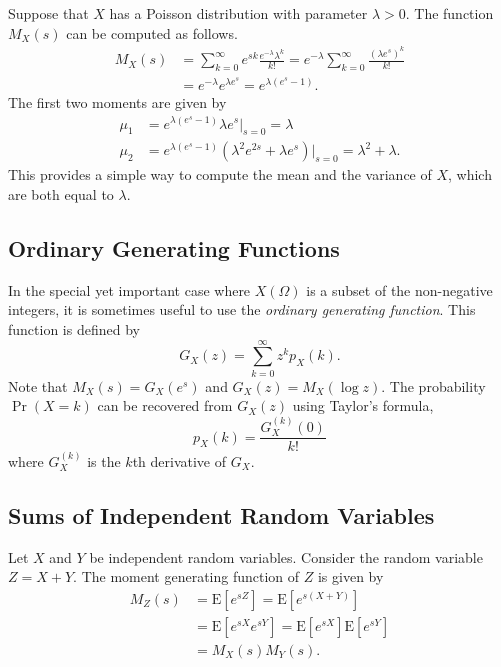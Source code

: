 \begin{example}
Suppose that $X$ has a Poisson distribution with parameter $\lambda > 0$.
The function $M_X(s)$ can be computed as follows.
\begin{equation*}
\begin{split}
M_X(s) &= \sum_{k = 0}^\infty e^{sk} \frac{e^{-\lambda}\lambda^k}{k!}
= e^{-\lambda} \sum_{k = 0}^\infty \frac{(\lambda e^s)^k}{k!} \\
&= e^{-\lambda} e^{\lambda e^s} = e^{\lambda(e^s - 1)} .
\end{split}
\end{equation*}
The first two moments are given by
\begin{align*}
\mu_1 &= e^{\lambda(e^s - 1)} \lambda e^s \Big|_{s = 0} = \lambda \\
\mu_2 &= e^{\lambda(e^s - 1)} \left( \lambda^2 e^{2s} + \lambda e^s \right)
\Big|_{s = 0} = \lambda^2 + \lambda .
\end{align*} 
This provides a simple way to compute the mean and the variance of $X$, which are both equal to $\lambda$.
\end{example}


\subsection{Ordinary Generating Functions}

In the special yet important case where $X(\Omega)$ is a subset of the non-negative integers, it is sometimes useful to use the \emph{ordinary generating function}.
This function is defined by
\begin{equation*}
G_X(z) = \sum_{k=0}^{\infty} z^k p_X (k) .
\end{equation*}
Note that $M_X (s) = G_X (e^s)$ and $G_X(z) = M_X (\log z)$.
The probability $\Pr (X = k)$ can be recovered from $G_X (z)$ using Taylor's formula,
\begin{equation*}
p_X(k) = \frac{G_X^{(k)} (0)}{k!}
\end{equation*}
where $G_X^{(k)}$ is the $k$th derivative of $G_X$.


\subsection{Sums of Independent Random Variables}

Let $X$ and $Y$ be independent random variables.
Consider the random variable $Z = X + Y$.
The moment generating function of $Z$ is given by
\begin{equation*}
\begin{split}
M_Z (s) &= \mathrm{E} \left[ e^{sZ} \right]
= \mathrm{E} \left[ e^{s(X + Y)} \right] \\
&= \mathrm{E} \left[ e^{sX} e^{sY} \right]
= \mathrm{E} \left[ e^{sX} \right] \mathrm{E} \left[ e^{sY} \right] \\
&= M_X(s) M_Y(s) .
\end{split}
\end{equation*}

